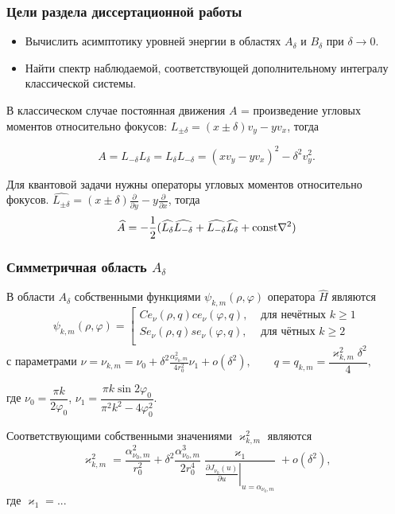 \begin{frame}
\frametitle{Цели раздела диссертационной работы}
\begin{itemize}
  \item Вычислить асимптотику уровней энергии в областях $A_\delta$ и $B_\delta$ при $\delta \to 0$.
  \item Найти спектр наблюдаемой, соответствующей дополнительному интегралу классической системы.

\end{itemize}
\begin{remark}
В классическом случае постоянная движения $A$ = произведение угловых моментов относительно фокусов:
$ L_{\pm \delta} = (x \pm \delta)v_y - y v_x$, тогда 

$$A = L_{-\delta} L_\delta = L_\delta L_{-\delta} = (x v_y - y v_x)^2 - \delta^2 v_y^2.$$ 

Для квантовой задачи нужны операторы угловых моментов относительно фокусов.
 $\widehat{ L_{\pm \delta} }= (x \pm \delta)\frac{\partial}{\partial y} - y\frac{\partial}{\partial x}$, тогда 
$$\widehat{A} = -\frac{1}{2}(\widehat{L_\delta} \widehat{L_{-\delta}} + \widehat{L_{-\delta}} \widehat{L_\delta} + \mathrm{const} \nabla ^2)$$
\end{remark}

\end{frame}


\begin{frame}
\frametitle{Симметричная область $A_\delta$} 
\begin{mytheorem}\label{th:A}
В области $A_\delta$ собственными функциями $\psi_{k, m}(\rho, \varphi)$ оператора $\hat{H}$ являются
\begin{equation*}
\psi_{k, m}(\rho, \varphi) = 
\left[
\begin{array}{ll}
    Ce_\nu(\rho, q) ce_\nu(\varphi, q) ,   &    \text{ для нечётных $k \geq 1$}\\
    Se_\nu(\rho, q) se_\nu(\varphi, q) ,   &    \text{ для чётных $k \geq 2$}\\
\end{array}
\right.
\end{equation*}
с параметрами
$\nu = \nu_{k,m} = \nu_0+ \delta^2 \frac{\alpha_{\nu_0, m}^2}{4 r_0^2}  \nu_1 + o(\delta^2), \qquad q=q_{k,m} = \dfrac{\varkappa_{k,m}^2 \delta^2}{4},$

где
$\nu_0 = \dfrac{\pi k}{2\varphi_0}$,
$\nu_1=\dfrac{\pi k \sin 2\varphi_0}{\pi^2 k^2 - 4\varphi_0^2}.$

Соответствующими собственными значениями   $\varkappa^2_{k, m}$ являются
\begin{equation*}
\varkappa^2_{k, m} = \dfrac{\alpha_{\nu_0, m}^2}{r_0^2} +
\delta^2 \dfrac{\alpha_{\nu_0, m}^3}{2 r_0^4}\dfrac{\varkappa_1 }{ \left.\frac{\partial J_{\nu_0}(u)}{\partial u}\right|_{u=\alpha_{\nu_0, m}} } + o(\delta^2),
\end{equation*}
где $\varkappa_1 = ...$
\end{mytheorem}
\end{frame} 

